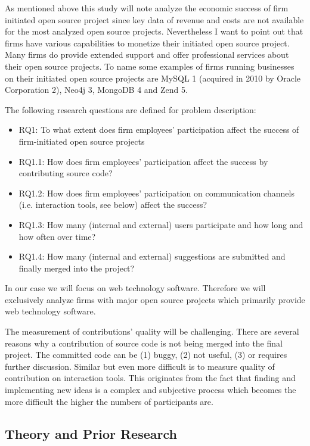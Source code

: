 As mentioned above this study will note analyze the economic success of firm initiated open source project since key data of revenue and costs are not available for the most analyzed open source projects. Nevertheless I want to point out that firms have various capabilities to monetize their initiated open source project. Many firms do provide extended support and offer professional services about their open source projects. To name some examples of firms running businesses on their initiated open source projects are MySQL 1 (acquired in 2010 by Oracle Corporation 2), Neo4j 3, MongoDB 4  and Zend 5.

The following research questions are defined for problem description:

\begin{itemize}
	\item RQ1: To what extent does firm employees’ participation affect the success of firm-initiated open source projects
	\item RQ1.1: How does firm employees’ participation affect the success by contributing source code?
	\item RQ1.2: How does firm employees’ participation on communication channels (i.e. interaction tools, see below) affect the success?
	\item RQ1.3: How many (internal and external) users participate and how long and how often over time?
	\item RQ1.4: How many (internal and external) suggestions are submitted and finally merged into the project?
\end{itemize}

In our case we will focus on web technology software. Therefore we will exclusively analyze firms with major open source projects which primarily provide web technology software.

The measurement of contributions’ quality will be challenging. There are several reasons why a contribution of source code is not being merged into the final project. The committed code can be (1) buggy, (2) not useful, (3) or requires further discussion. Similar but even more difficult is to measure quality of contribution on interaction tools. This originates from the fact that finding and implementing new ideas is a complex and subjective process which becomes the more difficult the higher the numbers of participants are.

\subsection{Theory and Prior Research}


